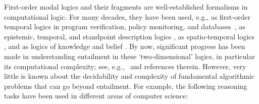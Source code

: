 \documentclass[10pt,a4paper]{amsart}
\theoremstyle{plain}
\theoremstyle{definition}
\begin{document}
First-order modal logics and their fragments are well-established formalisms in computational logic. For many decades, they have been used, e.g., as first-order temporal logics in program verification, policy monitoring, and databases~\cite{DBLP:series/eatcs/Kroger87,DBLP:conf/cav/BasinKM10,DBLP:conf/rv/HavelundP18,DBLP:reference/db/ChomickiT18a}, as epistemic, temporal, and standpoint description logics \cite{DBLP:journals/ai/DoniniLNNS98,DBLP:conf/time/LutzWZ08,DBLP:conf/time/ArtaleKKRWZ17,DBLP:conf/semweb/AlvarezRS22}, as spatio-temporal logics \cite{DBLP:reference/spatial/KontchakovKWZ07}, and as logics of knowledge and belief \cite{DBLP:journals/ai/BelardinelliL09,DBLP:journals/corr/Wang17d,liu_et_al:LIPIcs.MFCS.2022.70,DBLP:journals/apal/WangWS22}. By now, significant progress has been made in understanding entailment in these `two-dimensional' logics, in particular its computational complexity; see, e.g.,~\cite{GabEtAl03,DBLP:journals/tocl/HampsonK15,DBLP:journals/iandc/LiuPRW23,DBLP:journals/tocl/ArtaleMO24} and references therein. However, very little is known about the decidability and complexity of fundamental algorithmic problems that can go beyond entailment. For example, the following reasoning tasks have been used in different areas of computer science:
%
\end{document}
